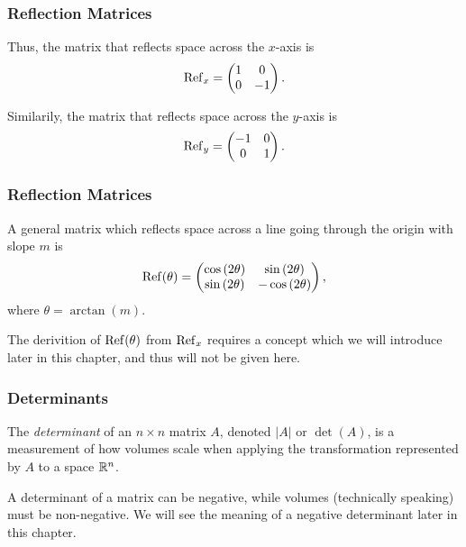 \begin{frame}
  \frametitle{Reflection Matrices}
  Thus, the matrix that reflects space across the $x$-axis is
  \begin{equation*}
    \operatorname{Ref}_{x} =
    \begin{pmatrix}
      1 & 0\\
      0 & -1
    \end{pmatrix}.
  \end{equation*}

  Similarily, the matrix that reflects space across the $y$-axis is
  \begin{equation*}
    \operatorname{Ref}_{y} =
    \begin{pmatrix}
      -1 & 0\\
      0 & 1
    \end{pmatrix}.
  \end{equation*}
\end{frame}

\begin{frame}
  \frametitle{Reflection Matrices}
  A general matrix which reflects space across a line going through the origin with slope $m$ is
  \begin{equation*}
    \operatorname{Ref}(\theta) =
    \begin{pmatrix}
      \cos\left( 2\theta \right) & \sin\left( 2\theta \right)\\
      \sin\left( 2\theta \right) & -\cos\left( 2\theta \right)
    \end{pmatrix},
  \end{equation*}
  where $\theta = \arctan(m)$.

  \begin{presentation_note}
    The derivition of $\operatorname{Ref}(\theta)$ from $\operatorname{Ref}_{x}$ requires a concept which we will introduce later in this chapter, and thus will not be given here. 
  \end{presentation_note}
\end{frame}

\begin{frame}
  \frametitle{Determinants}
  The \emph{determinant} of an $n\times n$ matrix $A$, denoted $|A|$ or $\det(A)$, is a measurement of how volumes scale when applying the transformation represented by $A$ to a space $\mathbb{R}^{n}$.

	\vspace{1cm}
  \begin{presentation_note}
    A determinant of a matrix can be negative, while volumes (technically speaking) must be non-negative. We will see the meaning of a negative determinant later in this chapter.
  \end{presentation_note}
\end{frame}

